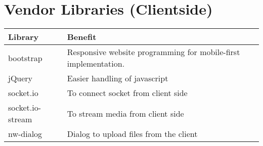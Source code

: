 \documentclass[10pt,a4paper,landscape]{article}
\begin{document}
\section{Vendor Libraries (Clientside)}
\begin{tabularx}{\textwidth}{ll}
    \textbf{Library}& \textbf{Benefit}       \\
    \toprule
    bootstrap       & Responsive website programming for mobile-first implementation.\\
    \midrule
    jQuery          & Easier handling of javascript \\
    \midrule
    socket.io       & To connect socket from client side\\
    \midrule
    socket.io-stream & To stream media from client side\\
    \midrule
    nw-dialog       & Dialog to upload files from the client\\
    \bottomrule
\end{tabularx}
    
\end{document}
